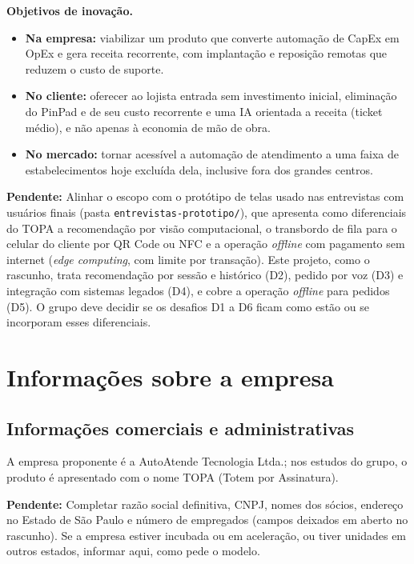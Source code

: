 \documentclass[12pt,a4paper]{article}
\newcommand{\pendente}[1]{\begin{pendbox}\textbf{\color{pendfg}Pendente:} #1\end{pendbox}}
\begin{document}
\textbf{Objetivos de inovação.}
\begin{itemize}
    \item \textbf{Na empresa:} viabilizar um produto que converte automação de CapEx em OpEx e gera receita recorrente, com implantação e reposição remotas que reduzem o custo de suporte.
    \item \textbf{No cliente:} oferecer ao lojista entrada sem investimento inicial, eliminação do PinPad e de seu custo recorrente e uma IA orientada a receita (ticket médio), e não apenas à economia de mão de obra.
    \item \textbf{No mercado:} tornar acessível a automação de atendimento a uma faixa de estabelecimentos hoje excluída dela, inclusive fora dos grandes centros.
\end{itemize}

\pendente{Alinhar o escopo com o protótipo de telas usado nas entrevistas com usuários finais (pasta \texttt{entrevistas-prototipo/}), que apresenta como diferenciais do TOPA a recomendação por visão computacional, o transbordo de fila para o celular do cliente por QR Code ou NFC e a operação \textit{offline} com pagamento sem internet (\textit{edge computing}, com limite por transação). Este projeto, como o rascunho, trata recomendação por sessão e histórico (D2), pedido por voz (D3) e integração com sistemas legados (D4), e cobre a operação \textit{offline} para pedidos (D5). O grupo deve decidir se os desafios D1 a D6 ficam como estão ou se incorporam esses diferenciais.}

\section{Informações sobre a empresa}

\subsection{Informações comerciais e administrativas}

A empresa proponente é a AutoAtende Tecnologia Ltda.; nos estudos do grupo, o produto é apresentado com o nome TOPA (Totem por Assinatura).

\pendente{Completar razão social definitiva, CNPJ, nomes dos sócios, endereço no Estado de São Paulo e número de empregados (campos deixados em aberto no rascunho). Se a empresa estiver incubada ou em aceleração, ou tiver unidades em outros estados, informar aqui, como pede o modelo.}
\end{document}
